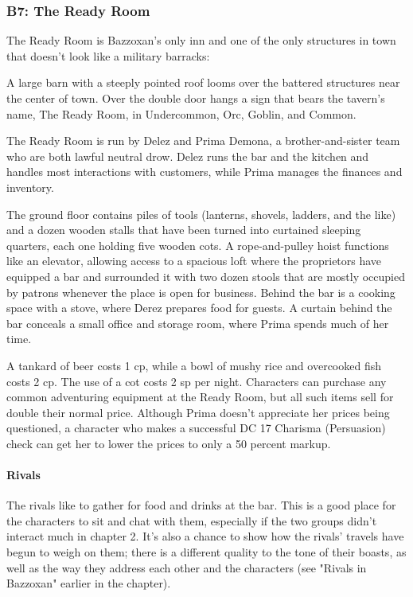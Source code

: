\documentclass[10pt,a4paper,twoside,twocolumn,openany,nodeprecatedcode]{dndbook}
\begin{document}
\subsubsection{B7: The Ready Room}
The Ready Room is Bazzoxan's only inn and one of the only structures in town that doesn't look like a military barracks:

\begin{DndReadAloud}{}
A large barn with a steeply pointed roof looms over the battered structures near the center of town. Over the double door hangs a sign that bears the tavern's name, The Ready Room, in Undercommon, Orc, Goblin, and Common.

\end{DndReadAloud}

The Ready Room is run by Delez and Prima Demona, a brother-and-sister team who are both lawful neutral drow. Delez runs the bar and the kitchen and handles most interactions with customers, while Prima manages the finances and inventory.

The ground floor contains piles of tools (lanterns, shovels, ladders, and the like) and a dozen wooden stalls that have been turned into curtained sleeping quarters, each one holding five wooden cots. A rope-and-pulley hoist functions like an elevator, allowing access to a spacious loft where the proprietors have equipped a bar and surrounded it with two dozen stools that are mostly occupied by patrons whenever the place is open for business. Behind the bar is a cooking space with a stove, where Derez prepares food for guests. A curtain behind the bar conceals a small office and storage room, where Prima spends much of her time.

A tankard of beer costs 1 cp, while a bowl of mushy rice and overcooked fish costs 2 cp. The use of a cot costs 2 sp per night. Characters can purchase any common adventuring equipment at the Ready Room, but all such items sell for double their normal price. Although Prima doesn't appreciate her prices being questioned, a character who makes a successful DC 17 Charisma (Persuasion) check can get her to lower the prices to only a 50 percent markup.

\paragraph{Rivals}
The rivals like to gather for food and drinks at the bar. This is a good place for the characters to sit and chat with them, especially if the two groups didn't interact much in chapter 2. It's also a chance to show how the rivals' travels have begun to weigh on them; there is a different quality to the tone of their boasts, as well as the way they address each other and the characters (see "Rivals in Bazzoxan" earlier in the chapter).
\end{document}
